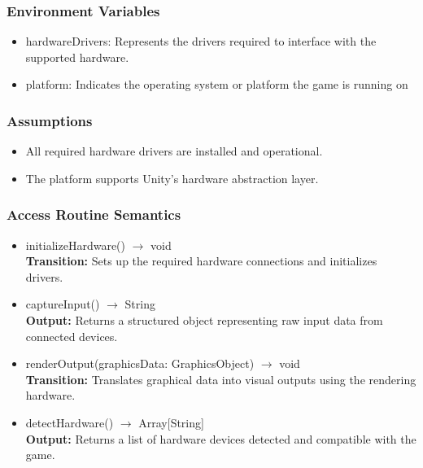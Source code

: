 \documentclass[12pt, titlepage]{article}
\begin{document}
\subsubsection{Environment Variables}
\begin{itemize}
\item hardwareDrivers: Represents the drivers required to interface with the supported hardware.
\item platform: Indicates the operating system or platform the game is running on 

\end{itemize}

\subsubsection{Assumptions}
\begin{itemize}
\item All required hardware drivers are installed and operational.
\item The platform supports Unity's hardware abstraction layer.
\end{itemize}

\subsubsection{Access Routine Semantics}

\begin{itemize}
\item initializeHardware() $\rightarrow$ void\\
\textbf{Transition:} Sets up the required hardware connections and initializes drivers.

\item captureInput() $\rightarrow$ String\\
\textbf{Output:} Returns a structured object representing raw input data from connected devices.


\item renderOutput(graphicsData: GraphicsObject) $\rightarrow$ void\\
\textbf{Transition:} Translates graphical data into visual outputs using the rendering hardware.

\item detectHardware() $\rightarrow$ Array[String]\\
\textbf{Output:} Returns a list of hardware devices detected and compatible with the game.

\end{itemize}
\end{document}
